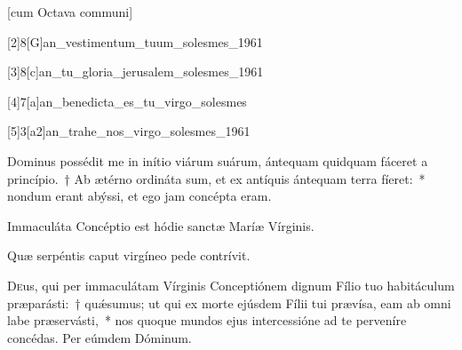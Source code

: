 \documentclass[vesperale_romanum.tex]{subfiles}
\begin{document}



\myrule


\thispagestyle{empty}
\label{8_decembris}

[cum Octava communi]



[2]{8}[G]{an_vestimentum_tuum_solesmes_1961}

\label{an_tu_gloria_jerusalem_solesmes_1961}
{}[3]{8}[c]{an_tu_gloria_jerusalem_solesmes_1961}

\label{an_benedicta_es_tu_virgo_solesmes}
{}[4]{7}[a]{an_benedicta_es_tu_virgo_solesmes}

[5]{3}[a2]{an_trahe_nos_virgo_solesmes_1961}


\lettrine{D}{o}minus possédit me in inítio viárum suárum, ántequam quidquam fáceret a princípio.~† Ab ætérno ordináta sum, et ex antíquis ántequam terra fíeret:~* nondum erant abýssi, et ego jam concépta eram.

\amsrubrique

\vv Immaculáta Concéptio est hódie sanctæ Maríæ Vírginis.

\rr Quæ serpéntis caput virgíneo pede contrívit.


\oratio

\lettrine{D}{e}us, qui per immaculátam Vírginis Conceptiónem dignum Fílio tuo habitáculum præparásti:~† quǽsumus; ut qui ex morte ejúsdem Fílii tui prævísa, eam ab omni labe præservásti,~* nos quoque mundos ejus intercessióne ad te perveníre concédas.
Per eúmdem Dóminum.
\end{document}
